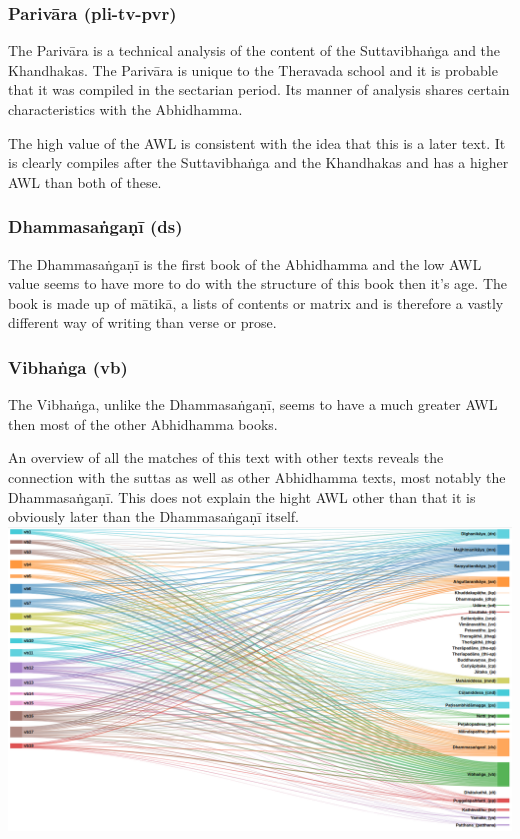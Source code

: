 \subsubsection{Parivāra (pli-tv-pvr)}
The Parivāra is a technical analysis of the content of the Suttavibhaṅga and the Khandhakas. The Parivāra is unique to the Theravada school and it is probable that it was compiled in the sectarian period. Its manner of analysis shares certain characteristics with the Abhidhamma.

The high value of the AWL is consistent with the idea that this is a later text. It is clearly compiles after the Suttavibhaṅga and the Khandhakas and has a higher AWL than both of these.

\subsubsection{Dhammasaṅgaṇī (ds)}
The Dhammasaṅgaṇī is the first book of the Abhidhamma and the low AWL value seems to have more to do with the structure of this book then it's age. The book is made up of mātikā, a lists of contents or matrix and is therefore a vastly different way of writing than verse or prose.

\subsubsection{Vibhaṅga (vb)}
The Vibhaṅga, unlike the Dhammasaṅgaṇī, seems to have a much greater AWL then most of the other Abhidhamma books. 

An overview of all the matches of this text with other texts reveals the connection with the suttas as well as other Abhidhamma texts, most notably the Dhammasaṅgaṇī. This does not explain the hight AWL other than that it is obviously later than the Dhammasaṅgaṇī itself.\\

\includegraphics[width=\linewidth]{vbmatches.png}
\label{vbmatches}

